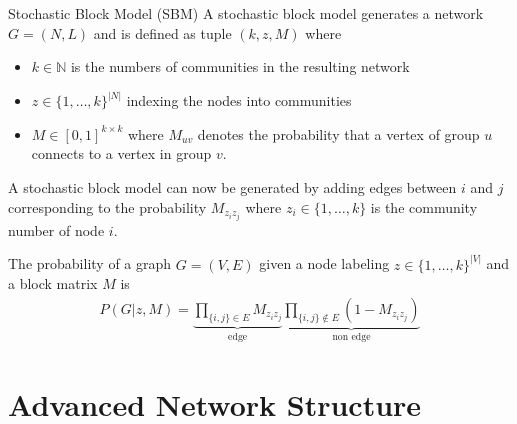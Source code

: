 \documentclass[english]{panikzettel}
\begin{document}
\begin{defi}{Stochastic Block Model (SBM)}
A stochastic block model generates a network $ G = (N,L) $ and is defined as tuple $ (k,z,M) $ where
\begin{itemize}
	\item $ k \in \mathbb{N} $ is the numbers of communities in the resulting network
	\item $ z \in \{1, \dots, k\}^{|N|} $ indexing the nodes into communities
	\item $ M \in [0,1]^{k \times k} $ where $ M_{uv} $ denotes the probability that a vertex of group $ u $ connects to a vertex in group $ v $.
\end{itemize}
\end{defi}

A stochastic block model can now be generated by adding edges between $ i $ and $ j $ corresponding to the probability $ M_{z_i z_j} $ where $ z_i \in \{1, \dots, k\} $ is the community number of node $ i $.

The probability of a graph $ G = (V,E) $ given a node labeling $ z \in \{1,\dots, k\}^{|V|} $ and a block matrix $ M $ is
\begin{align*}
	P(G | z, M) = \underbrace{\prod\limits_{\{i,j\} \in E} M_{z_i z_j}}_\text{edge} \underbrace{\prod\limits_{\{i,j\} \notin E} (1 - M_{z_i z_j})}_\text{non edge}
\end{align*}

\section{Advanced Network Structure}
\end{document}
